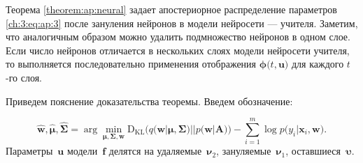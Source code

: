 Теорема \ref{theorem:ap:neural} задает апостериорное распределение параметров \eqref{ch:3:eq:ap:3} после зануления нейронов в модели нейросети --- учителя. Заметим, что аналогичным образом можно удалить подмножество нейронов в одном слое. Если число нейронов отличается в нескольких слоях модели нейросети учителя, то выполняется последовательно применения отображения $\bm{\phi}\bigr(t, \mathbf{u}\bigr)$ для каждого $t$-го слоя.


Приведем пояснение доказательства теоремы. Введем обозначение:

\[
\hat{\mathbf{w}}, \hat{\bm{\mu}}, \hat{\bm{\Sigma}} = \arg \min_{\bm{\mu}, \bm{\Sigma}, \mathbf{w}} \text{D}_{\text{KL}}\bigr(q\bigr(\mathbf{w}|\bm{\mu}, \bm{\Sigma}\bigr)||p\bigr(\mathbf{w}|\mathbf{A}\bigr)\bigr) - \sum_{i=1}^{m}\log p\bigr(y_i|\mathbf{x}_{i}, \mathbf{w}\bigr).
\]
Параметры~$\mathbf{u}$ модели~$\mathbf{f}$ делятся на {\color{red} удаляемые~$\bm{\nu}_2$}, {\color{blue} зануляемые~$\bm{\nu}_1$}, {оставшиеся~$\bm{\upsilon}$}.

